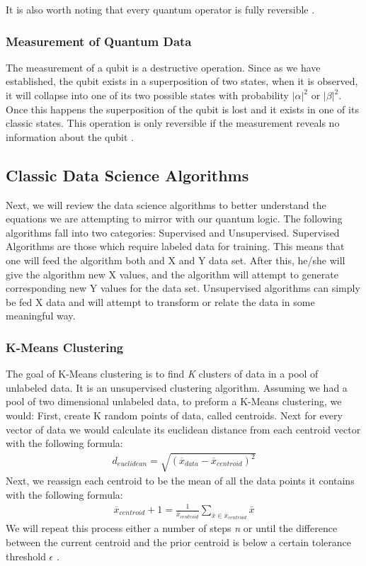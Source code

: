 \documentclass[conference]{IEEEtran}
\begin{document}
It is also worth noting that every quantum operator is fully reversible \cite{b9}.
\subsubsection{Measurement of Quantum Data}
The measurement of a qubit is a destructive operation. Since as we have established, the qubit exists in a superposition of two states, when it is observed, it will collapse into one of its two possible states with probability $|\alpha|^2$ or $|\beta|^2$. Once this happens the superposition of the qubit is lost and it exists in one of its classic states. This operation is only reversible if the measurement reveals no information about the qubit \cite{b9}. 

\subsection{Classic Data Science Algorithms}
Next, we will review the data science algorithms to better understand the equations we are attempting to mirror with our quantum logic. The following algorithms fall into two categories: Supervised and Unsupervised. Supervised Algorithms are those which require labeled data for training. This means that one will feed the algorithm both and X and Y data set. After this, he/she will give the algorithm new X values, and the algorithm will attempt to generate corresponding new Y values for the data set. Unsupervised algorithms can simply be fed X data and will attempt to transform or relate the data in some meaningful way. 
\subsubsection{K-Means Clustering}
The goal of K-Means clustering is to find \emph{K} clusters of data in a pool of unlabeled data. It is an unsupervised clustering algorithm. Assuming we had a pool of two dimensional unlabeled data, to preform a K-Means clustering, we would: First, create K random points of data, called centroids. Next for every vector of data we would calculate its euclidean distance from each centroid vector with the following formula:
\begin{align*}
d_{euclidean} = \sqrt{(\overline{x}_{data} - \overline{x}_{centroid})^2}
\end{align*}
Next, we reassign each centroid to be the mean of all the data points it contains  with the following formula:
\begin{align*}
\overline{x}_{centroid} + 1 = \frac{1}{\overline{x}_{centroid}}  \sum_{\bar{x}\in\overline{x}_{centroid}} \bar{x}
\end{align*}
We will repeat this process either a number of steps \emph{n} or until the difference between the current centroid and the prior centroid is below a certain tolerance threshold $\epsilon$ \cite{b10}. 
\end{document}
